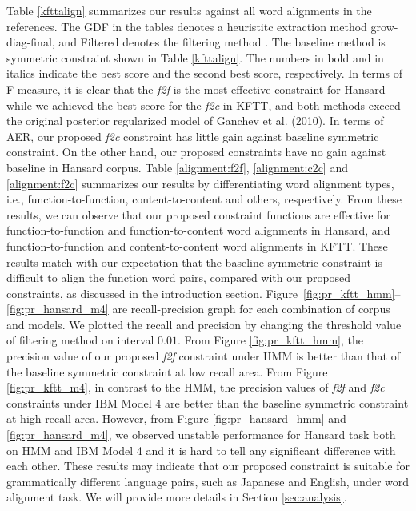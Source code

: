 \documentclass[english]{jnlp_1.4}
\begin{document}
Table \ref{kfttalign} summarizes our results against all word alignments in the references.
The GDF in the tables denotes a heuristitc extraction method grow-diag-final, and Filtered denotes the filtering method \cite{liang-taskar-klein:2006:HLT-NAACL06-Main}.
The baseline method is symmetric constraint \cite{ganchev2010posterior} shown in Table \ref{kfttalign}.
The numbers in bold and in italics indicate the best score and the second best score, respectively.
In terms of F-measure, it is clear that the \textit{f2f}  is the most effective constraint for Hansard while we achieved the best score for the \textit{f2c} in KFTT, and both methods exceed the original posterior regularized model of Ganchev et al. (2010).
In terms of AER, our proposed \textit{f2c} constraint has little gain against baseline symmetric constraint.
On the other hand, our proposed constraints have no gain against baseline in Hansard corpus.
Table \ref{alignment:f2f}, \ref{alignment:c2c} and \ref{alignment:f2c} summarizes our results by differentiating word alignment types, i.e., function-to-function, content-to-content and others, respectively.
From these results, we can observe that our proposed constraint functions are effective for function-to-function and function-to-content word alignments in Hansard, and function-to-function and content-to-content word alignments in KFTT.
These results match with our expectation that the baseline symmetric constraint is difficult to align the function word pairs, compared with our proposed constraints, as discussed in the introduction section.
Figure~\ref{fig:pr_kftt_hmm}--\ref{fig:pr_hansard_m4} are recall-precision graph for each combination of corpus and models.
We plotted the recall and precision by changing the threshold value of filtering method \cite{liang-taskar-klein:2006:HLT-NAACL06-Main} on interval $0.01$.
From Figure \ref{fig:pr_kftt_hmm}, the precision value of our proposed \textit{f2f}  constraint under HMM is better than that of the baseline symmetric constraint at low recall area.
From Figure \ref{fig:pr_kftt_m4}, in contrast to the HMM, the precision values of \textit{f2f}  and \textit{f2c} constraints under IBM Model 4 are better than the baseline symmetric constraint at high recall area.
However, from Figure \ref{fig:pr_hansard_hmm} and \ref{fig:pr_hansard_m4}, we observed unstable performance for Hansard task both on HMM and IBM Model 4 and it is hard to tell any significant difference with each other.
These results may indicate that our proposed constraint is suitable for grammatically different language pairs, such as Japanese and English, under word alignment task.
We will provide more details in Section \ref{sec:analysis}.
\end{document}
